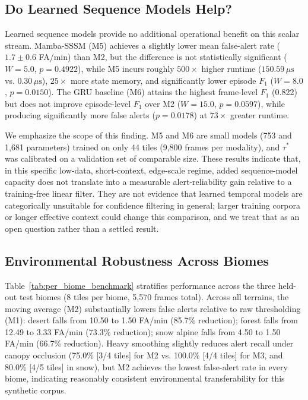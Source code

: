 \documentclass[conference]{IEEEtran}
\begin{document}
\subsection{Do Learned Sequence Models Help?}
Learned sequence models provide no additional operational benefit on this scalar stream. Mamba-SSSM (M5) achieves a slightly lower mean false-alert rate ($1.7\pm0.6$ FA/min) than M2, but the difference is not statistically significant ($W=5.0$, $p=0.4922$), while M5 incurs roughly $500\times$ higher runtime ($150.59\,\mu\text{s}$ vs. $0.30\,\mu\text{s}$), $25\times$ more state memory, and significantly lower episode $F_1$ ($W=8.0$, $p=0.0150$). The GRU baseline (M6) attains the highest frame-level $F_1$ (0.822) but does not improve episode-level $F_1$ over M2 ($W=15.0$, $p=0.0597$), while producing significantly more false alerts ($p=0.0178$) at $73\times$ greater runtime.

We emphasize the scope of this finding. M5 and M6 are small models (753 and 1,681 parameters) trained on only 44 tiles (9,800 frames per modality), and $\tau^*$ was calibrated on a validation set of comparable size. These results indicate that, in this specific low-data, short-context, edge-scale regime, added sequence-model capacity does not translate into a measurable alert-reliability gain relative to a training-free linear filter. They are not evidence that learned temporal models are categorically unsuitable for confidence filtering in general; larger training corpora or longer effective context could change this comparison, and we treat that as an open question rather than a settled result.

\subsection{Environmental Robustness Across Biomes}
Table~\ref{tab:per_biome_benchmark} stratifies performance across the three held-out test biomes (8 tiles per biome, 5,570 frames total). Across all terrains, the moving average (M2) substantially lowers false alerts relative to raw thresholding (M1): desert falls from 10.50 to 1.50 FA/min (85.7\% reduction); forest falls from 12.49 to 3.33 FA/min (73.3\% reduction); snow alpine falls from 4.50 to 1.50 FA/min (66.7\% reduction). Heavy smoothing slightly reduces alert recall under canopy occlusion (75.0\% [3/4 tiles] for M2 vs. 100.0\% [4/4 tiles] for M3, and 80.0\% [4/5 tiles] in snow), but M2 achieves the lowest false-alert rate in every biome, indicating reasonably consistent environmental transferability for this synthetic corpus.
\end{document}
